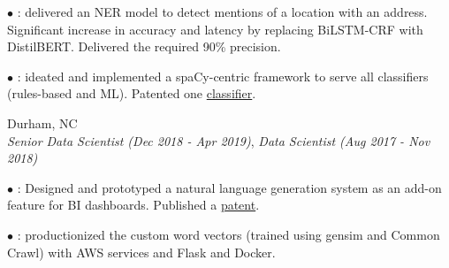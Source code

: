\documentclass[resmargin]{resume_style_class} %
\newenvironment{outline}
  {\begin{list}{}{\setlength{\leftmargin}{30pt}\setlength\itemsep{-2pt}}}
  {\end{list}}
\newenvironment{outline-cond}
  {\begin{list}{}{
  \setlength{\leftmargin}{30pt}
  \setlength\topsep{-10pt}
  \setlength\itemindent{-30pt}
  }}
  {\end{list}}
\begin{document}
\begin{resume}
\begin{outline}
	\item[$\bullet$\hspace{0.1cm}] : delivered an NER model to detect mentions of a location with an address. Significant increase in accuracy and latency by replacing BiLSTM-CRF with DistilBERT. Delivered the required 90\% precision. 
	\item[$\bullet$\hspace{0.1cm}]  : ideated and implemented a spaCy-centric framework to serve all classifiers (rules-based and ML). Patented one \href{https://image-ppubs.uspto.gov/dirsearch-public/print/downloadPdf/11586739}{classifier}.
\end{outline} 

\begin{large}  \end{large} \hfill Durham, NC
\vspace{5pt} \\
\textit{Senior Data Scientist (Dec 2018 - Apr 2019)}, \textit{Data Scientist (Aug 2017 - Nov 2018)}
\vspace{2pt}
\begin{outline}
	\item[$\bullet$\hspace{0.1cm}] : Designed and prototyped a natural language generation system as an add-on feature for BI dashboards. Published a  \href{https://image-ppubs.uspto.gov/dirsearch-public/print/downloadPdf/20220414324}{patent}.
	\item[$\bullet$\hspace{0.1cm}] : productionized the custom word vectors (trained using gensim and Common Crawl) with AWS services and Flask and Docker.
\end{outline} 




\end{resume}
\end{document}
